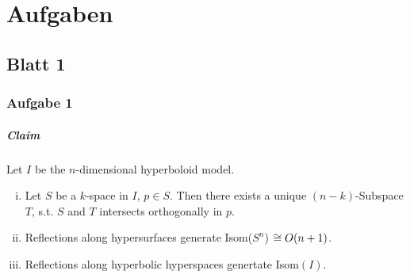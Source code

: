 \documentclass{book}
\begin{document}
\chapter{Aufgaben}

\section{Blatt 1}
\subsection{Aufgabe 1}
\paragraph{Claim}
Let $I$ be the $n$-dimensional hyperboloid model.
\begin{enumerate}[(i)]
	\item Let $S$ be a $k$-space in $I$, $p \in S$. Then there exists a unique $(n-k)$-Subspace $T$, s.t. $S$ and $T$ intersects orthogonally in $p$.
	\item Reflections along hypersurfaces generate Isom($S^n$) $\overset{}{\cong} O(n+1)$.
	\item Reflections along hyperbolic hyperspaces genertate Isom$(I)$.
\end{enumerate}
\end{document}
